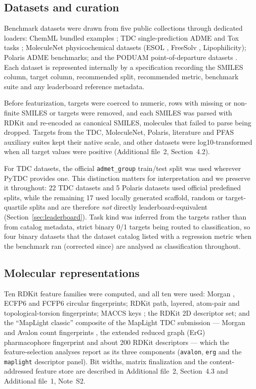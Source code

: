 \subsection{Datasets and curation}\label{sec:datasets}

Benchmark datasets were drawn from five public collections through dedicated loaders: ChemML bundled examples \cite{haghighatlari2020chemml}; TDC single-prediction ADME and Tox tasks \cite{huang2021tdc}; MoleculeNet physicochemical datasets (ESOL \cite{delaney2004esol}, FreeSolv \cite{mobley2014freesolv}, Lipophilicity); Polaris ADME benchmarks; and the PODUAM point-of-departure datasets \cite{vonborries2026uncertainty}. Each dataset is represented internally by a specification recording the SMILES column, target column, recommended split, recommended metric, benchmark suite and any leaderboard reference metadata.

Before featurization, targets were coerced to numeric, rows with missing or non-finite SMILES or targets were removed, and each SMILES was parsed with RDKit \cite{rdkit} and re-encoded as canonical SMILES, molecules that failed to parse being dropped. Targets from the TDC, MoleculeNet, Polaris, literature and PFAS auxiliary suites kept their native scale, and other datasets were log10-transformed when all target values were positive (Additional file~2, Section~4.2).

For TDC datasets, the official \texttt{admet\_group} train/test split was used wherever PyTDC provides one. This distinction matters for interpretation and we preserve it throughout: 22 TDC datasets and 5 Polaris datasets used official predefined splits, while the remaining 17 used locally generated scaffold, random or target-quartile splits and are therefore \emph{not} directly leaderboard-equivalent (Section~\ref{sec:leaderboard}). Task kind was inferred from the targets rather than from catalog metadata, strict binary 0/1 targets being routed to classification, so four binary datasets that the dataset catalog listed with a regression metric when the benchmark ran (corrected since) are analysed as classification throughout.

\subsection{Molecular representations}\label{sec:representations}

Ten RDKit feature families were computed, and all ten were used: Morgan \cite{rogers2010ecfp}, ECFP6 and FCFP6 circular fingerprints; RDKit path, layered, atom-pair and topological-torsion fingerprints; MACCS keys \cite{durant2002maccs}; the RDKit 2D descriptor set; and the ``MapLight classic'' composite of the MapLight TDC submission \cite{notwell2023admet} --- Morgan and Avalon count fingerprints \cite{gedeck2006qsar}, the extended reduced graph (ErG) pharmacophore fingerprint \cite{stiefl2006erg} and about 200 RDKit descriptors --- which the feature-selection analyses report as its three components (\texttt{avalon}, \texttt{erg} and the \texttt{maplight} descriptor panel). Bit widths, matrix finalization and the content-addressed feature store are described in Additional file~2, Section~4.3 and Additional file~1, Note~S2.

